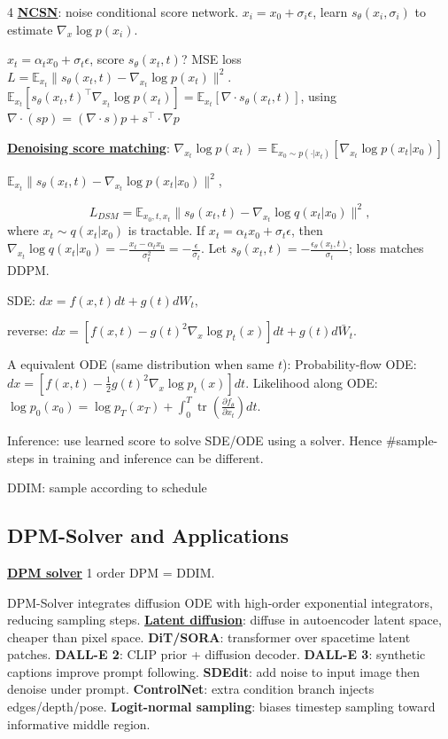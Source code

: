 \documentclass{article}
\newcommand{\key}[1]{\textbf{#1}}
\newcommand{\lowterm}[1]{\textbf{\underline{#1}}}
\newcommand{\E}{\mathbb{E}}
\newcommand{\1}{\mathbf 1}
\DeclareMathOperator{\tr}{tr}
\begin{document}
\begin{multicols*}{4}
\lowterm{NCSN}: noise conditional score network. 
$x_i=x_0+\sigma_i\epsilon$, learn $s_\theta(x_i,\sigma_i)$ to estimate $\nabla_x \log p(x_i)$.  

$x_t=\alpha_tx_0+\sigma_t\epsilon$, score $s_\theta(x_t,t)$? MSE loss $L=\E_{x_t}\|s_\theta(x_t,t)-\nabla_{x_t}\log p(x_t)\|^2$. $\E_{x_t}[s_\theta(x_t,t)^\top \nabla_{x_t}\log p(x_t)]= \E_{x_t}[\nabla\cdot s_\theta(x_t,t)]$, using $\nabla\cdot(sp)=(\nabla\cdot s)p+s^\top \cdot\nabla p$


\lowterm{Denoising score matching}: 
$\nabla_{x_t}\log p(x_t)=\E_{x_0\sim p(\cdot|x_t)}[\nabla_{x_t}\log p(x_t|x_0)]$
 
$\E_{x_t}\|s_\theta(x_t,t)-\nabla_{x_t}\log p(x_t|x_0)\|^2$, 

\[
L_{DSM}=\E_{x_0,t,x_t}\|s_\theta(x_t,t)-\nabla_{x_t}\log q(x_t|x_0)\|^2,
\]
where $x_t\sim q(x_t|x_0)$ is tractable. If $x_t=\alpha_t x_0+\sigma_t\epsilon$, then $\nabla_{x_t}\log q(x_t|x_0)=-\frac{x_t-\alpha_t x_0}{\sigma_t^2}=-\frac{\epsilon}{\sigma_t}$. Let $s_\theta(x_t,t)=-\frac{\epsilon_\theta(x_t,t)}{\sigma_t}$; loss matches DDPM.


SDE:
\(
dx=f(x,t)dt+g(t)dW_t,
\)

reverse: $dx=[f(x,t)-g(t)^2\nabla_x\log p_t(x)]dt+g(t)d\bar W_t$.

A equivalent ODE (same distribution when same $t$):
Probability-flow ODE:
\(
dx=\left[f(x,t)-\frac12g(t)^2\nabla_x\log p_t(x)\right]dt.
\)
Likelihood along ODE:
\(
\log p_0(x_0)=\log p_T(x_T)+\int_0^T\tr\left(\frac{\partial f_\theta}{\partial x_t}\right)dt.
\)

Inference: use learned score to solve SDE/ODE using a solver. Hence \#sample-steps in training and inference can be different. 

DDIM: sample according to schedule 


\subsection{DPM-Solver and Applications}

\lowterm{DPM solver} 1 order DPM = DDIM. 

DPM-Solver integrates diffusion ODE with high-order exponential integrators, reducing sampling steps. \lowterm{Latent diffusion}: diffuse in autoencoder latent space, cheaper than pixel space. \key{DiT/SORA}: transformer over spacetime latent patches. \key{DALL-E 2}: CLIP prior + diffusion decoder. \key{DALL-E 3}: synthetic captions improve prompt following. \key{SDEdit}: add noise to input image then denoise under prompt. \key{ControlNet}: extra condition branch injects edges/depth/pose. \key{Logit-normal sampling}: biases timestep sampling toward informative middle region.


\end{multicols*}
\end{document}

